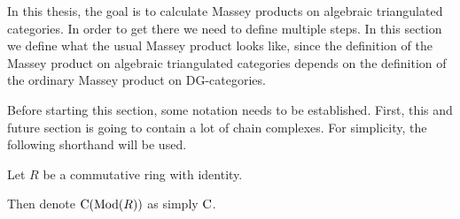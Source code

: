 In this thesis, the goal is to calculate Massey products on algebraic triangulated categories. In order to get there we need to define multiple steps. In this section we define what the usual Massey product looks like, since the definition of the Massey product on algebraic triangulated categories depends on the definition of the ordinary Massey product on DG-categories.

Before starting this section, some notation needs to be established. First, this and future section is going to contain a lot of chain complexes. For simplicity, the following shorthand will be used.
\begin{notation}
    Let \( R \) be a commutative ring with identity.

    Then denote \( \operatorname{C}(\operatorname{Mod}(R)) \) as simply \( \operatorname{C} \).
\end{notation}

